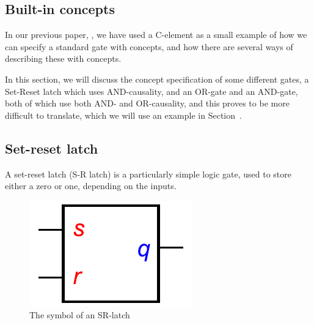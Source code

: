 \documentclass[british,conference,compsoc]{IEEEtran}
\begin{document}

\subsection{Built-in concepts \label{sub:built-in}}

In our previous paper, \cite{2015_Beaumont_MEMOCODE}, we have 
used a C-element as a small example of how we can specify a standard gate with concepts,
and how there are several ways of describing these with concepts. 

In this section, we will discuss the concept specification of some different gates,
a Set-Reset latch which uses AND-causality, and an OR-gate and an AND-gate, both of 
which use both AND- and OR-causality, and this proves to be more difficult to translate,
which we will use an example in Section~\label{translation-algorithm}.


\subsection{Set-reset latch \label{sub:srlatch}}

A set-reset latch (S-R latch) is a particularly simple logic gate, used to store either a zero or one,
depending on the inputs. 


\begin{figure}[h]
\begin{centering}
\includegraphics[scale=0.51]{Images/sr-latch-circuit}
\par\end{centering}
\protect\caption{\label{fig:sr-latch-circuit} The symbol of an SR-latch}
\end{figure}
\end{document}

